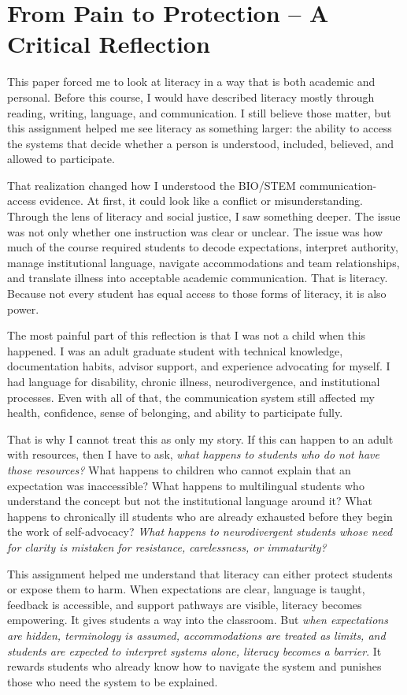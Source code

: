 \section*{From Pain to Protection -- A Critical Reflection}

This paper forced me to look at literacy in a way that is both academic and personal. Before this course, I would have described literacy mostly through reading, writing, language, and communication. I still believe those matter, but this assignment helped me see literacy as something larger: the ability to access the systems that decide whether a person is understood, included, believed, and allowed to participate.

That realization changed how I understood the BIO/STEM communication-access evidence. At first, it could look like a conflict or misunderstanding. Through the lens of literacy and social justice, I saw something deeper. The issue was not only whether one instruction was clear or unclear. The issue was how much of the course required students to decode expectations, interpret authority, manage institutional language, navigate accommodations and team relationships, and translate illness into acceptable academic communication. That is literacy. Because not every student has equal access to those forms of literacy, it is also power.

The most painful part of this reflection is that I was not a child when this happened. I was an adult graduate student with technical knowledge, documentation habits, advisor support, and experience advocating for myself. I had language for disability, chronic illness, neurodivergence, and institutional processes. Even with all of that, the communication system still affected my health, confidence, sense of belonging, and ability to participate fully.

That is why I cannot treat this as only my story. If this can happen to an adult with resources, then I have to ask, \textit{what happens to students who do not have those resources?} What happens to children who cannot explain that an expectation was inaccessible? What happens to multilingual students who understand the concept but not the institutional language around it? What happens to chronically ill students who are already exhausted before they begin the work of self-advocacy? \textit{What happens to neurodivergent students whose need for clarity is mistaken for resistance, carelessness, or immaturity?}

This assignment helped me understand that literacy can either protect students or expose them to harm. When expectations are clear, language is taught, feedback is accessible, and support pathways are visible, literacy becomes empowering. It gives students a way into the classroom. But \textit{when expectations are hidden, terminology is assumed, accommodations are treated as limits, and students are expected to interpret systems alone, literacy becomes a barrier}. It rewards students who already know how to navigate the system and punishes those who need the system to be explained.

